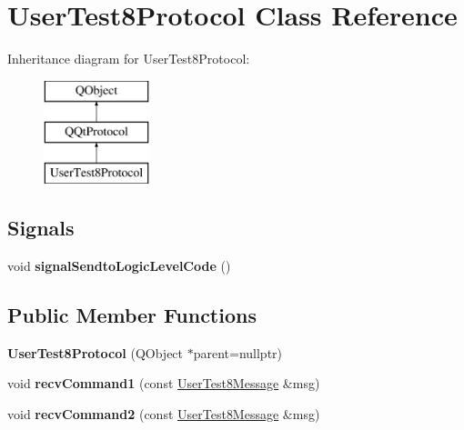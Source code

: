 \hypertarget{class_user_test8_protocol}{}\section{User\+Test8\+Protocol Class Reference}
\label{class_user_test8_protocol}
Inheritance diagram for User\+Test8\+Protocol\+:\begin{figure}[H]
\begin{center}
\leavevmode
\includegraphics[height=3.000000cm]{class_user_test8_protocol}
\end{center}
\end{figure}
\subsection*{Signals}
\begin{DoxyCompactItemize}
\item 
\mbox{\label{class_user_test8_protocol_afbf2d0bce4af2e4435805ae3dd390be7}} 
void {\bfseries signal\+Sendto\+Logic\+Level\+Code} ()
\end{DoxyCompactItemize}
\subsection*{Public Member Functions}
\begin{DoxyCompactItemize}
\item 
\mbox{\label{class_user_test8_protocol_af6c8ac3b5791e669e4b16e5bf1e70302}} 
{\bfseries User\+Test8\+Protocol} (Q\+Object $\ast$parent=nullptr)
\item 
\mbox{\label{class_user_test8_protocol_aabb07cd4eece4dcd33e5ff153495413f}} 
void {\bfseries recv\+Command1} (const \mbox{\hyperlink{class_user_test8_message}{User\+Test8\+Message}} \&msg)
\item 
\mbox{\label{class_user_test8_protocol_aaa80137f1c35bcf8a2d429e5863fd030}} 
void {\bfseries recv\+Command2} (const \mbox{\hyperlink{class_user_test8_message}{User\+Test8\+Message}} \&msg)
\end{DoxyCompactItemize}
